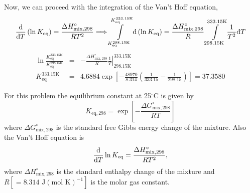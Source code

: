 \documentclass[calculator,allquestions,datasheet,solutions]{exam_newMarcus2}
\newcommand{\frc}{\displaystyle\frac}
\renewcommand{\d}[1]{\mathrm{d} #1 }
\begin{document}
\begin{question}
\begin{enumerate}[(a)]
{\begin{displaymath}
          \end{displaymath}
           Now, we can proceed with the integration of the Van't Hoff equation,~
          \begin{displaymath} 
              \frc{\d}{\d T} \left(\ln{K_{\text{eq}}}\right) = \frc{\Delta H^{\circ}_{\text{mix},298}}{RT^{2}} \Longrightarrow \int\limits_{K_{\text{eq}}^{298.15\text{K}}}^{K_{\text{eq}}^{333.15\text{K}}} \d\left(\ln{K_{\text{eq}}}\right) = \frc{\Delta H^{\circ}_{\text{mix},298}}{R}\int\limits_{298.15\text{K}}^{333.15\text{K}}\frc{1}{T^{2}}\d T
          \end{displaymath}
          \begin{eqnarray}
              \ln{\frc{K_{\text{eq}}^{333.15\text{K}}}{K_{\text{eq}}^{298.15\text{K}}}} &=& -\frc{\Delta H^{\circ}_{\text{mix},298}}{R} \left.\frc{1}{T}\right|_{298.15\text{K}}^{333.15\text{K}} \nonumber \\
             K_{\text{eq}}^{333.15\text{K}} &=&  4.6884 \exp{ \left[-\frc{48970}{8.314}\left(\frc{1}{333.15} - \frc{1}{298.15}\right)\right] } = 37.3580 \nonumber 
           \end{eqnarray}

}
%
\end{enumerate}
        For this problem the equilibrium constant at 25$^{\circ}$C is given by
          \begin{displaymath}
              K_{\text{eq},298} = \exp{\left[-\frc{\Delta G^{\circ}_{\text{mix},298}}{R T}\right]}
          \end{displaymath}
          where $\Delta G^{\circ}_{\text{mix},298}$ is the standard free Gibbs energy change of the mixture. Also the Van't Hoff equation is
          \begin{displaymath}
               \frc{\d}{\d T} \ln{K_{\text{eq}}} = \frc{\Delta H^{\circ}_{\text{mix},298}}{RT^{2}},
          \end{displaymath}
          where $\Delta H^{\circ}_{\text{mix},298}$ is the standard enthalpy change of the mixture and $R\left[=\text{8.314 J}\left(\text{mol K}\right)^{-1}\right]$ is the molar gas constant.
%
\end{question}

\clearpage
\end{document}

